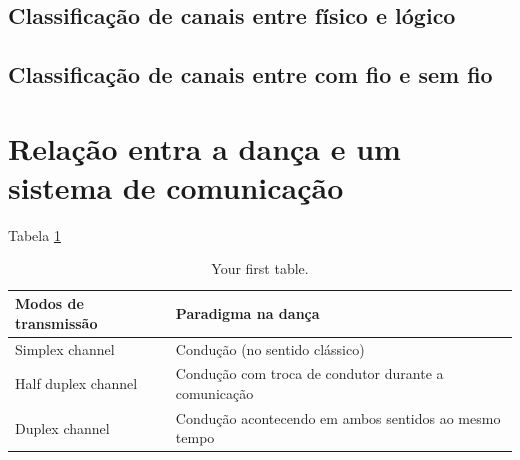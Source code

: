 \documentclass[a4paper,10pt]{article}
\begin{document}
\subsection{Classificação de canais entre físico e lógico}
\subsection{Classificação de canais entre com fio e sem fio}

\section{Relação entra a dança e um sistema de comunicação}
Tabela \ref{tab:table1}
\begin{table}[h!]
  \begin{center}
    \caption{Your first table.}
    \label{tab:table1}
    \begin{tabular}{|l|p{6cm}|} %
    \hline
      Modos de transmissão & Paradigma na dança \\ \hline \hline
      Simplex channel & Condução (no sentido clássico)  \\ \hline
      Half duplex channel & Condução com troca de condutor durante a comunicação\\ \hline
      Duplex channel & Condução acontecendo em ambos sentidos ao mesmo tempo \\ \hline
    \end{tabular}
  \end{center}
\end{table}

\end{document}
